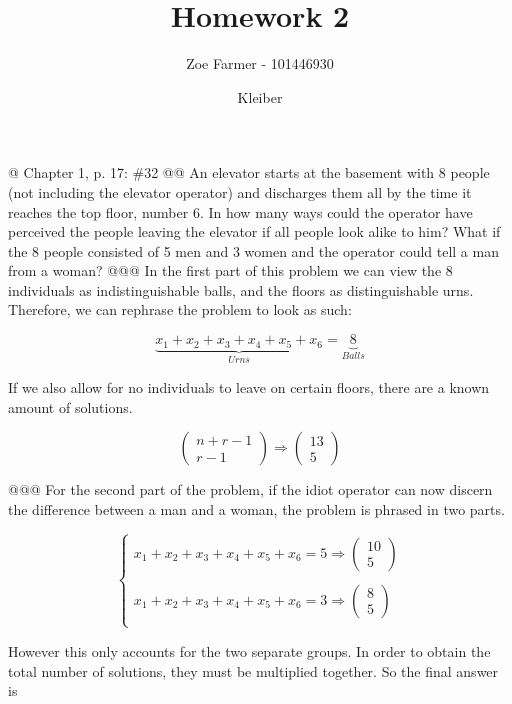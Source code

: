 \documentclass[10pt]{article}
\title{Homework 2}
\date{Kleiber}
\author{Zoe Farmer - 101446930}
\begin{document}
\maketitle

\begin{easylist}[enumerate]
    @ Chapter 1, p. 17: \#32
    @@ An elevator starts at the basement with 8 people (not including the elevator operator) and discharges them all by the time it reaches the top floor, number 6. In how many ways could the operator have perceived the people leaving the elevator if all people look alike to him? What if the 8 people consisted of 5 men and 3 women and the operator could tell a man from a woman?
    @@@ In the first part of this problem we can view the 8 individuals as indistinguishable balls, and the floors as distinguishable urns. Therefore, we can rephrase the problem to look as such:

    \[ \underbrace{x_1 + x_2 + x_3 + x_4 + x_5 + x_6}_{Urns} = \underbrace{8}_{Balls} \]

    If we also allow for no individuals to leave on certain floors, there are a known amount of solutions.

    \[ \begin{pmatrix}n + r - 1\\ r - 1\end{pmatrix} \Rightarrow \boxed{\begin{pmatrix}13\\5\end{pmatrix} } \]

    @@@ For the second part of the problem, if the idiot operator can now discern the difference between a man and a woman, the problem is phrased in two parts.

    \[ \begin{cases}
            x_1 + x_2 + x_3 + x_4 + x_5 + x_6 = 5 \Rightarrow \begin{pmatrix}10\\5\end{pmatrix}\\\\
            x_1 + x_2 + x_3 + x_4 + x_5 + x_6 = 3 \Rightarrow \begin{pmatrix}8\\5\end{pmatrix}\\
    \end{cases} \]

    However this only accounts for the two separate groups. In order to obtain the total number of solutions, they must be multiplied together. So the final answer is


\end{easylist}
\end{document}
